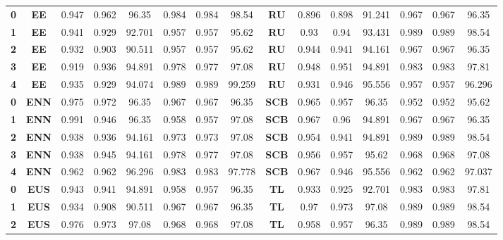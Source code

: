 {{\begin{tabular}{c|c|cccccc|ccccccc}
\textbf{0} & \textbf{EE} & 0.947 & 0.962 & 96.35 & 0.984 & 0.984 & 98.54 & \multicolumn{1}{c|}{\textbf{RU}} & 0.896 & 0.898 & 91.241 & 0.967 & 0.967 & 96.35 \\
\textbf{1} & \textbf{EE} & 0.941 & 0.929 & 92.701 & 0.957 & 0.957 & 95.62 & \multicolumn{1}{c|}{\textbf{RU}} & 0.93  & 0.94  & 93.431 & 0.989 & 0.989 & 98.54 \\
\textbf{2} & \textbf{EE} & 0.932 & 0.903 & 90.511 & 0.957 & 0.957 & 95.62 & \multicolumn{1}{c|}{\textbf{RU}} & 0.944 & 0.941 & 94.161 & 0.967 & 0.967 & 96.35 \\
\textbf{3} & \textbf{EE} & 0.919 & 0.936 & 94.891 & 0.978 & 0.977 & 97.08 & \multicolumn{1}{c|}{\textbf{RU}} & 0.948 & 0.951 & 94.891 & 0.983 & 0.983 & 97.81 \\
\textbf{4} & \textbf{EE} & 0.935 & 0.929 & 94.074 & 0.989 & 0.989 & 99.259 & \multicolumn{1}{c|}{\textbf{RU}} & 0.931 & 0.946 & 95.556 & 0.957 & 0.957 & 96.296 \\
\textbf{0} & \textbf{ENN} & 0.975 & 0.972 & 96.35 & 0.967 & 0.967 & 96.35 & \multicolumn{1}{c|}{\textbf{SCB}} & 0.965 & 0.957 & 96.35 & 0.952 & 0.952 & 95.62 \\
\textbf{1} & \textbf{ENN} & 0.991 & 0.946 & 96.35 & 0.958 & 0.957 & 97.08 & \multicolumn{1}{c|}{\textbf{SCB}} & 0.967 & 0.96  & 94.891 & 0.967 & 0.967 & 96.35 \\
\textbf{2} & \textbf{ENN} & 0.938 & 0.936 & 94.161 & 0.973 & 0.973 & 97.08 & \multicolumn{1}{c|}{\textbf{SCB}} & 0.954 & 0.941 & 94.891 & 0.989 & 0.989 & 98.54 \\
\textbf{3} & \textbf{ENN} & 0.938 & 0.945 & 94.161 & 0.978 & 0.977 & 97.08 & \multicolumn{1}{c|}{\textbf{SCB}} & 0.956 & 0.957 & 95.62 & 0.968 & 0.968 & 97.08 \\
\textbf{4} & \textbf{ENN} & 0.962 & 0.962 & 96.296 & 0.983 & 0.983 & 97.778 & \multicolumn{1}{c|}{\textbf{SCB}} & 0.967 & 0.946 & 95.556 & 0.962 & 0.962 & 97.037 \\
\textbf{0} & \textbf{EUS} & 0.943 & 0.941 & 94.891 & 0.958 & 0.957 & 96.35 & \multicolumn{1}{c|}{\textbf{TL}} & 0.933 & 0.925 & 92.701 & 0.983 & 0.983 & 97.81 \\
\textbf{1} & \textbf{EUS} & 0.934 & 0.908 & 90.511 & 0.967 & 0.967 & 96.35 & \multicolumn{1}{c|}{\textbf{TL}} & 0.97  & 0.973 & 97.08 & 0.989 & 0.989 & 98.54 \\
\textbf{2} & \textbf{EUS} & 0.976 & 0.973 & 97.08 & 0.968 & 0.968 & 97.08 & \multicolumn{1}{c|}{\textbf{TL}} & 0.958 & 0.957 & 96.35 & 0.989 & 0.989 & 98.54 \\

\end{tabular}}}
